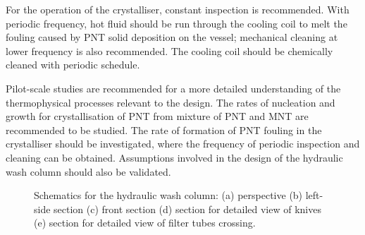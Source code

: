 For the operation of the crystalliser, constant inspection is recommended. With periodic frequency, hot fluid should be run through the cooling coil to melt the fouling caused by PNT solid deposition on the vessel; mechanical cleaning at lower frequency is also recommended. The cooling coil should be chemically cleaned with periodic schedule. 


Pilot-scale studies are recommended for a more detailed understanding of the thermophysical processes relevant to the design. The rates of nucleation and growth for crystallisation of PNT from mixture of PNT and MNT are recommended to be studied. The rate of formation of PNT fouling in the crystalliser should be investigated, where the frequency of periodic inspection and cleaning can be obtained. Assumptions involved in the design of the hydraulic wash column should also be validated. 

\begin{figure}
    \centering
    
    \caption{Schematics for the hydraulic wash column: (a) perspective (b) left-side section (c) front section (d) section for detailed view of knives (e) section for detailed view of filter tubes crossing.}
    \label{fig:wash column schematic}
\end{figure}





